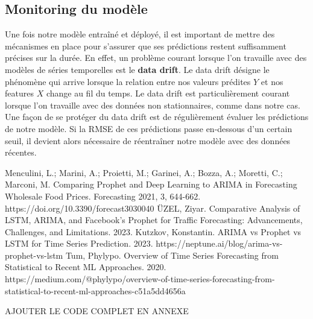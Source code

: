 \documentclass[french]{article}
\begin{document}
    \subsection{Monitoring du modèle}
    
    Une fois notre modèle entraîné et déployé, il est important de mettre des mécanismes en place pour s'assurer que ses prédictions restent suffisamment précises sur la durée. En effet, un problème courant lorsque l'on travaille avec des modèles de séries temporelles est le \textbf{data drift}. Le data drift désigne le phénomène qui arrive lorsque la relation entre nos valeurs prédites $Y$ et nos features $X$ change au fil du temps. Le data drift est particulièrement courant lorsque l'on travaille avec des données non stationnaires, comme dans notre cas.
    Une façon de se protéger du data drift est de régulièrement évaluer les prédictions de notre modèle. Si la RMSE de ces prédictions passe en-dessous d'un certain seuil, il devient alors nécessaire de réentraîner notre modèle avec des données récentes.

    \newpage
    \begin{thebibliography}{4}
         Menculini, L.; Marini, A.; Proietti, M.; Garinei, A.; Bozza, A.; Moretti, C.; Marconi, M. Comparing Prophet and Deep Learning to ARIMA in Forecasting Wholesale Food Prices. Forecasting 2021, 3, 644-662. https://doi.org/10.3390/forecast3030040
         ÜZEL, Ziyar. Comparative Analysis of LSTM, ARIMA, and Facebook’s Prophet for Traffic Forecasting: Advancements, Challenges, and Limitations. 2023. 
         Kutzkov, Konstantin. ARIMA vs Prophet vs LSTM for Time Series Prediction. 2023. https://neptune.ai/blog/arima-vs-prophet-vs-lstm
         Tum, Phylypo. Overview of Time Series Forecasting from Statistical to Recent ML Approaches. 2020. https://medium.com/@phylypo/overview-of-time-series-forecasting-from-statistical-to-recent-ml-approaches-c51a5dd4656a
    \end{thebibliography}

    AJOUTER LE CODE COMPLET EN ANNEXE

    
\end{document}

